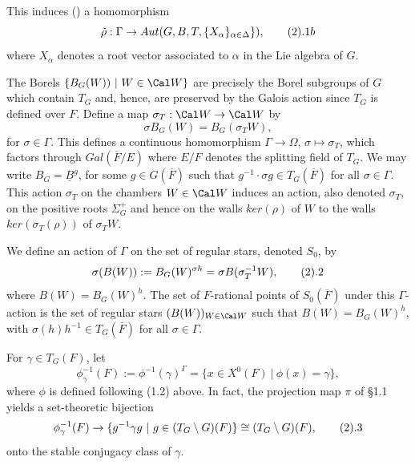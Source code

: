 This induces (\cite{Sp2}) a homomorphism
$$
\tilde{\rho}:\Gamma\rightarrow 
Aut(G,B,T,\{X_{\alpha}\}_{\alpha\in\Delta}\}),
\tag 2.1b
$$
where $X_\alpha$ denotes a root vector associated to $\alpha$
in the Lie algebra of $G$.
\par
The Borels
$\{{B}_G(W))\ |\ W\in {\Cal W}\}$ are precisely the Borel
subgroups of $G$ which contain ${T}_G$ and, hence, are preserved by the
Galois action since ${T}_G$ is defined over $F$. Define
a map $\sigma_T:{\Cal W}\rightarrow {\Cal W}$ by
$$
\sigma {B}_G(W)={B}_G(\sigma_T W),
$$
for $\sigma\in\Gamma$. This defines a continuous homomorphism
$\Gamma\rightarrow \Omega$,
$\sigma\longmapsto \sigma_T$, which factors through $Gal(\overline{F}/E)$
where $E/F$ denotes the splitting field of $T_G$.
We may write $B_G=\underline{B}^g$,
for some $g\in G(\overline{F})$ such that
$g^{-1}\cdot \sigma g\in T_G(\overline{F})$ for all $\sigma\in \Gamma$.
This action $\sigma_T$ on the chambers $W\in {\Cal W}$ induces an action,
also denoted $\sigma_T$, on the positive roots $\Sigma_G^+$ and hence on
the walls $ker(\rho)$ of $W$ to the walls
$ker(\sigma_T(\rho))$ of
$\sigma_TW$.

\par
We define an action of
$\Gamma$ on the set of regular stars, denoted $S_0$, by
$$
\sigma (B(W)):={B}_G(W)^{\sigma h}
=\sigma{B}(\sigma_T^{-1}W),
\tag 2.2
$$
where $B(W)=B_G(W)^h$.
The set of $F$-rational points of $S_0(\overline{F})$ 
under this $\Gamma$-action is the set
of regular stars $(B(W))_{W\in {\Cal W}}$ such that
$B(W)=B_G(W)^h$, with $\sigma(h)h^{-1}\in T_G(\overline{F})$
for all $\sigma\in\Gamma$.
\par

For $\gamma\in T_G(F)$, let
$$
\phi_\gamma^{-1}(F):=\phi^{-1}(\gamma)^\Gamma=
\{x\in X^0(F)\ |\ \phi(x)=\gamma\},
$$
where $\phi$ is defined following (1.2) above.
In fact, the projection map $\pi$ of \S 1.1
yields a set-theoretic bijection
$$
\phi_\gamma^{-1}(F)
\rightarrow \{g^{-1}\gamma g\ |\ g\in (T_G\setminus G)(F)\}
\cong (T_G\setminus G)(F),
\tag 2.3
$$
onto the stable conjugacy class of $\gamma$.


